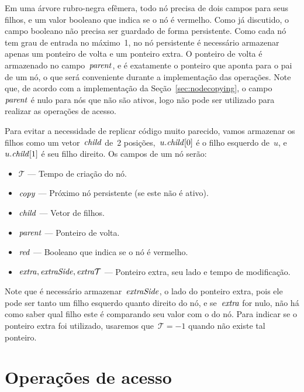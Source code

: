 \documentclass[../../main.tex]{subfiles}
\begin{document}
\newcommand{\ts}{\mathcal{T}}
\renewcommand{\copy}{\V{copy}}
\newcommand{\child}{\V{child}}
\newcommand{\parent}{\V{parent}}
\newcommand{\red}{\V{red}}
\newcommand{\extra}{\V{extra}}
\newcommand{\eSide}{\V{extraSide}}
\newcommand{\eTs}{\V{extra\mathcal{T}}}
\newcommand{\version}{\V{version}}
\newcommand{\side}{\V{side}}
\newcommand{\roots}{\V{roots}}


Em uma árvore rubro-negra efêmera, todo nó precisa de dois campos para seus filhos, e um valor booleano que indica se o nó é vermelho. Como já discutido, o campo booleano não precisa ser guardado de forma persistente. Como cada nó tem grau de entrada no máximo~1, no nó persistente é necessário armazenar apenas um ponteiro de volta e um ponteiro extra. O ponteiro de volta é armazenado no campo~$\parent$, e é exatamente o ponteiro que aponta para o pai de um nó, o que será conveniente durante a implementação das operações. Note que, de acordo com a implementação da Seção~\ref{sec:nodecopying}, o campo~$\parent$ é nulo para nós que não são ativos, logo não pode ser utilizado para realizar as operações de acesso.

Para evitar a necessidade de replicar código muito parecido, vamos armazenar os filhos como um vetor~$\child$ de~2 posições,~$u.\child[0]$ é o filho esquerdo de~$u$, e~$u.\child[1]$ é seu filho direito. Os campos de um nó serão:
\begin{itemize}
\item $\ts$ --- Tempo de criação do nó.
\item $\copy$ --- Próximo nó persistente (se este não é ativo).
\item $\child$ --- Vetor de filhos.
\item $\parent$ --- Ponteiro de volta.
\item $\red$ --- Booleano que indica se o nó é vermelho.
\item $\extra, \eSide, \eTs$ --- Ponteiro extra, seu lado e tempo de modificação.
\end{itemize}

Note que é necessário armazenar~$\eSide$, o lado do ponteiro extra, pois ele pode ser tanto um filho esquerdo quanto direito do nó, e se~$\extra$ for nulo, não há como saber qual filho este é comparando seu valor com o do nó. Para indicar se o ponteiro extra foi utilizado, usaremos que~$\ts = -1$ quando não existe tal ponteiro.

\section{Operações de acesso}
\end{document}
